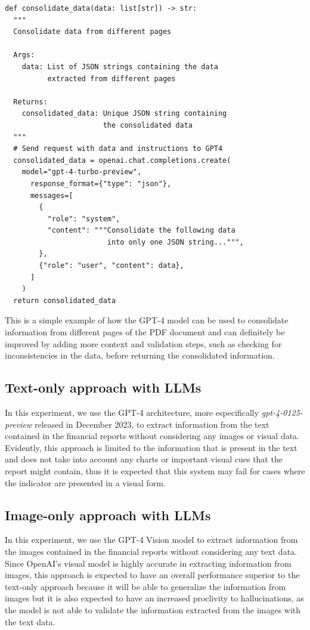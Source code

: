 \documentclass[english, 12pt, a4paper, elec, utf8, a-2b, online]{aaltothesis}
\begin{document}
\begin{verbatim}
def consolidate_data(data: list[str]) -> str:
  """
  Consolidate data from different pages

  Args:
    data: List of JSON strings containing the data
          extracted from different pages

  Returns:
    consolidated_data: Unique JSON string containing
                       the consolidated data
  """
  # Send request with data and instructions to GPT4
  consolidated_data = openai.chat.completions.create(
    model="gpt-4-turbo-preview",
      response_format={"type": "json"},
      messages=[
        {
          "role": "system",
          "content": """Consolidate the following data
                        into only one JSON string...""",
        },
        {"role": "user", "content": data},
      ]
    )
  return consolidated_data
\end{verbatim}

This is a simple example of how the \ac{GPT}-4 model can be used to consolidate information from different pages of the \ac{PDF} document and can definitely be improved by adding more context and validation steps, such as checking for inconsistencies in the data, before returning the consolidated information.


\subsection{Text-only approach with LLMs}

In this experiment, we use the \ac{GPT}-4 architecture, more especifically \textit{gpt-4-0125-preview} released in December 2023, to extract information from the text contained in the financial reports without considering any images or visual data.
Evidently, this approach is limited to the information that is present in the text and does not take into account any charts or important visual cues that the report might contain, thus it is expected that this system may fail for cases where the indicator are presented in a visual form.

\subsection{Image-only approach with LLMs}

In this experiment, we use the \ac{GPT}-4 Vision model to extract information from the images contained in the financial reports without considering any text data.
Since OpenAI's visual model is highly accurate in extracting information from images, this approach is expected to have an overall performance superior to the text-only approach because it will be able to generalize the information from images but it is also expected to have an increased proclivity to hallucinations, as the model is not able to validate the information extracted from the images with the text data.
\end{document}
